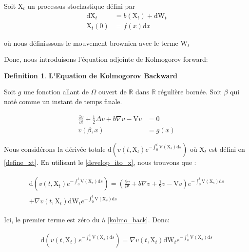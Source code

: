 \documentclass[11pt]{article}
\theoremstyle{definition}
\newtheorem{definition}{Definition}[section]
\theoremstyle{remark}
\begin{document}
Soit $\mathrm{X}_{t}$ un processus stochastique défini par  
\begin{equation}
\label{define_xt}
\begin{split}
\mathrm{dX}_{t} &= b(\mathrm{X}_{t}) + \mathrm{dW}_{t}\\
\mathrm{X}_{t}(0) &= f(x)\mathrm{d}x
\end{split}
\end{equation}

où nous définisssons le mouvement brownien avec le terme $\mathrm{W}_t$

Donc, nous introduisons l'équation adjointe de Kolmogorov forward:

\begin{definition}{\textbf{L'Equation de Kolmogorov Backward}}

Soit $g$ une fonction allant de $\Omega$ ouvert de $\mathbb{R}$ dans $\mathbb{R}$ régulière bornée. Soit $\beta$ qui noté comme un instant de temps finale. 

\begin{equation}
\label{kolmo_back}
\begin{split}
\frac{\partial v}{\partial t} + \frac{1}{2} \Delta v + b \nabla v - \mathrm{V}v &= 0 \\
v(\beta, x) &= g(x)
\end{split}
\end{equation}
\end{definition}

Nous considérons la dérivée totale $\mathrm{d}(v(t, \mathrm{X}_{t}) e^{-\int_0^{t} \mathrm{V}(\mathrm{X}_{s}) \mathrm{d}s})$ où $\mathrm{X}_{t}$ est défini en \eqref{define_xt}. En utilisant le \eqref{develop_ito_x}, nous trouvons que :

\begin{multline}
\begin{split}
\mathrm{d}(v(t, \mathrm{X}_{t}) e^{-\int_0^{t} \mathrm{V}(\mathrm{X}_{s}) \mathrm{d}s}) = (\frac{\partial v}{\partial t} + b \nabla v + \frac{1}{2}v - \mathrm{V}v)e^{-\int_0^{t} \mathrm{V}(\mathrm{X}_{s}) \mathrm{d}s} \\
+ \nabla v(t, \mathrm{X}_t)\mathrm{dW}_{t} e^{-\int_0^{t} \mathrm{V}(\mathrm{X}_{s}) \mathrm{d}s}
\end{split}
\end{multline}

Ici, le premier terme est zéro du à \eqref{kolmo_back}. Donc:

\begin{align}
\mathrm{d}(v(t, \mathrm{X}_{t}) e^{-\int_0^{t} \mathrm{V}(\mathrm{X}_{s}) \mathrm{d}s}) = \nabla v(t, \mathrm{X}_t)\mathrm{dW}_{t} e^{-\int_0^{t} \mathrm{V}(\mathrm{X}_{s}) \mathrm{d}s}
\end{align}
\end{document}
